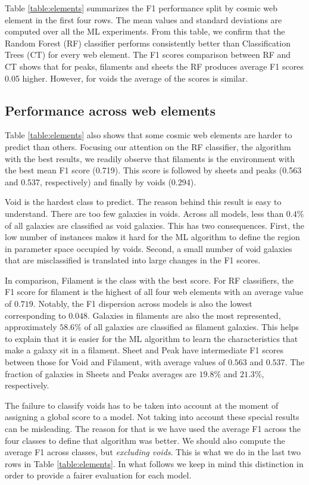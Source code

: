 \documentclass[usenatbib]{mnras}
\begin{document}
Table \ref{table:elements} summarizes the F1 performance split by cosmic
web element in the first four rows.
The mean values and standard deviations are computed over all the ML experiments. 
From this table, we confirm that the Random Forest (RF) classifier performs
consistently better than Classification Trees (CT) for every web element.
The F1 scores comparison between RF and CT shows that for peaks, filaments and
sheets the RF produces average F1 scores 0.05 higher. 
However, for voids the average of the scores is similar. 

\subsection{Performance across web elements}

Table \ref{table:elements} also shows that some cosmic web elements 
are harder to predict than others.
Focusing our attention on the RF classifier, the algorithm with the
best results, we readily observe that filaments is the environment
with the best mean F1 score (0.719).
This score is followed by sheets and peaks (0.563 and 0.537,
respectively) and finally by voids (0.294).

Void is the hardest class to predict. 
The reason behind this result is easy to understand. 
There are too few galaxies in voids.
Across all models, less than $0.4\%$ of all galaxies
are classified as void galaxies.
This has two consequences.
First, the low number of instances makes it hard for the ML algorithm to
define the region in parameter space occupied by voids.
Second, a small number of void galaxies that are misclassified is translated into large changes in the F1 scores.

In comparison, Filament is the class with the best score.
For RF classifiers, the F1 score for filament is the highest of all four
web elements with an average value of  $0.719$.
Notably, the F1 dispersion across models is also the lowest
corresponding to $0.048$.
Galaxies in filaments are also the most represented,
approximately $58.6\%$ of all galaxies are classified as filament galaxies.
This helps to explain that it is easier for the ML algorithm to learn
the characteristics that make a galaxy sit in a filament.
Sheet and Peak have intermediate F1 scores between
those for Void and Filament, with average values of $0.563$ and $0.537$.
The fraction of galaxies in Sheets and Peaks averages are $19.8\%$ and $21.3\%$, respectively. 

The failure to classify voids has to be taken into account at the
moment of assigning a global score to a model.
Not taking into account these special results can be misleading.
The reason for that is we have used the average F1 across the
four classes to define that algorithm was better. 
We should also compute the average F1 across classes, but
\emph{excluding voids}.
This is what we do in the last two rows in Table \ref{table:elements}.
In what follows we keep in mind this distinction in order to provide a
fairer evaluation for each model.
\end{document}
